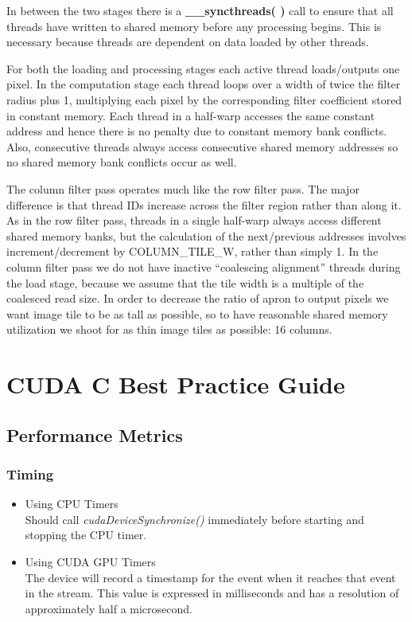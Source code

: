 In between the two stages there is a \textbf{\_\_syncthreads( )} call to ensure that all threads
have written to shared memory before any processing begins. This is necessary because
threads are dependent on data loaded by other threads.

For both the loading and processing stages each active thread loads/outputs one
pixel. In the computation stage each thread loops over a width of twice the filter radius plus
1, multiplying each pixel by the corresponding filter coefficient stored in constant memory.
Each thread in a half-warp accesses the same constant address and hence there is no penalty
due to constant memory bank conflicts. Also, consecutive threads always access consecutive
shared memory addresses so no shared memory bank conflicts occur as well.

The column filter pass operates much like the row filter pass. The major difference
is that thread IDs increase across the filter region rather than along it. As in the row filter
pass, threads in a single half-warp always access different shared memory banks, but the
calculation of the next/previous addresses involves increment/decrement by
COLUMN\_TILE\_W, rather than simply 1. In the column filter pass we do not have inactive
“coalescing alignment” threads during the load stage, because we assume that the tile width
is a multiple of the coalesced read size. In order to decrease the ratio of apron to output
pixels we want image tile to be as tall as possible, so to have reasonable shared memory
utilization we shoot for as thin image tiles as possible: 16 columns.

\section{CUDA C Best Practice Guide}
\subsection{Performance Metrics}
\subsubsection{Timing}
\begin{itemize}
\item Using CPU Timers \\
	Should call \textit{cudaDeviceSynchronize()} immediately before starting and stopping the CPU timer.
\item Using CUDA GPU Timers\\
	The device will record a timestamp for the event when it reaches that event in the stream. This value is expressed in milliseconds and has a resolution of approximately half a microsecond.
\end{itemize}
